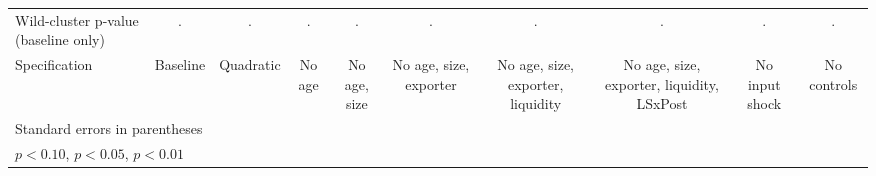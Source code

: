 \begin{table}[htbp]
\begin{tabular}{l*{9}{c}}
Wild-cluster p-value (baseline only)&           .         &           .         &           .         &           .         &           .         &           .         &           .         &           .         &           .         \\
Specification&    Baseline         &   Quadratic         &      No age         &No age, size         &No age, size, exporter         &No age, size, exporter, liquidity         &No age, size, exporter, liquidity, LSxPost         &No input shock         & No controls         \\
\hline\hline
\multicolumn{10}{l}{\footnotesize Standard errors in parentheses}\\
\multicolumn{10}{l}{\footnotesize \sym{*} \(p<0.10\), \sym{**} \(p<0.05\), \sym{***} \(p<0.01\)}\\
\end{tabular}
\end{table}
